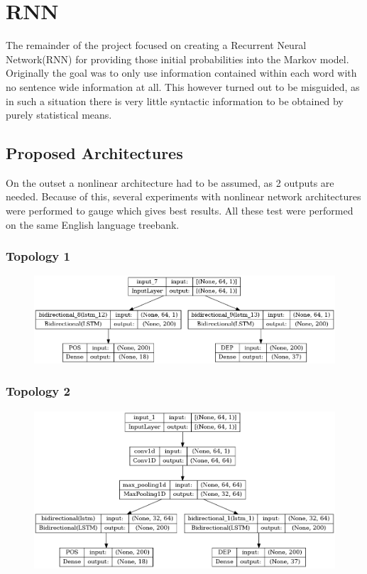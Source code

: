 \chapter{RNN}
The remainder of the project focused on creating a Recurrent Neural Network(RNN) for providing those initial probabilities into the Markov model.
Originally the goal was to only use information contained within each word with no sentence wide information at all. This however turned out to
be misguided, as in such a situation there is very little syntactic information to be obtained by purely statistical means.
\section{Proposed Architectures}
On the outset a nonlinear architecture had to be assumed, as 2 outputs are needed. Because of this, several experiments with nonlinear network architectures were performed to gauge which gives best results. All these test were performed on the same English language treebank.
\subsection{Topology 1}
\begin{figure}[h!]
        \centering
        \includegraphics[width=\linewidth]{TOPO/TOPO_3.png}
    \end{figure}
    \clearpage
\subsection{Topology 2}
\begin{figure}[h!]
        \centering
        \includegraphics[width=\linewidth]{TOPO/TOPO_2.png}
    \end{figure}
    \clearpage
